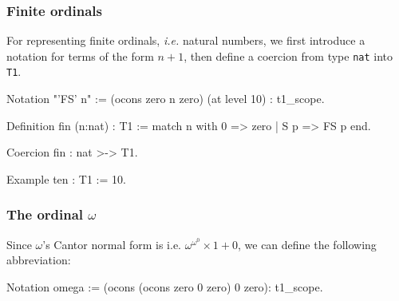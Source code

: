 \subsubsection{Finite ordinals}
\label{sec:orgheadline67}

For representing finite ordinals, \emph{i.e.} natural numbers, we first introduce a notation for terms of the form $n+1$, then define a coercion from type \texttt{nat} into \texttt{T1}.
\label{sect:notation-FS}

\begin{Coqsrc}
Notation "'FS' n" :=
     (ocons zero n zero) (at level 10) : t1_scope.
\end{Coqsrc}

\label{sect:notation-F}

\begin{Coqsrc}
Definition fin (n:nat) : T1 := 
    match n with 0 => zero | S p => FS p end. 

Coercion fin  : nat >-> T1.

Example ten : T1 := 10.   
\end{Coqsrc}



\subsubsection{The ordinal \(\omega\)}
\label{sec:orgheadline68}

  Since \(\omega\)'s Cantor normal form is
i.e. \(\omega^{\omega^0}\times 1+ 0\), we can define the following abbreviation:

\label{sect:omega-notation2}
\begin{Coqsrc}
Notation omega := (ocons (ocons zero 0 zero) 0 zero): t1_scope.
\end{Coqsrc}

